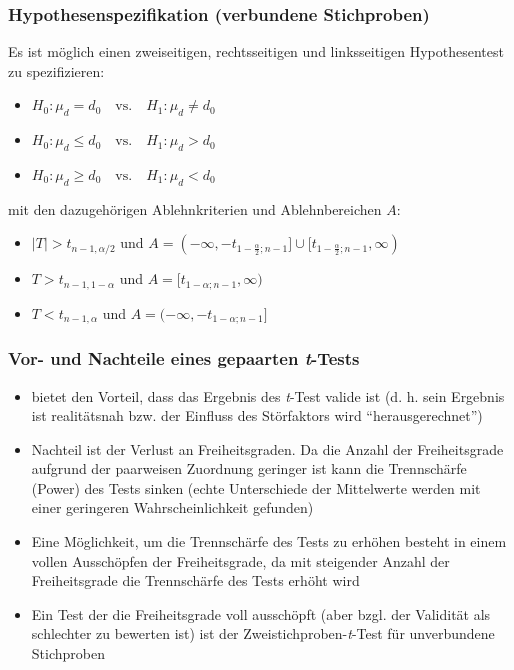 \documentclass{beamer}
\begin{document}
\begin{frame}
\frametitle{Hypothesenspezifikation (verbundene Stichproben)}

Es ist möglich einen zweiseitigen, rechtsseitigen und linksseitigen Hypothesentest zu spezifizieren:
\begin{itemize}
\item $H_0\colon \mu_{d} = d_{0} \quad \text{vs.} \quad H_1\colon \mu_{d} \ne d_{0}$
\item $H_0\colon \mu_{d} \leq d_{0} \quad \text{vs.} \quad H_1\colon \mu_{d} > d_{0}$
\item $H_0\colon \mu_{d} \geq d_{0} \quad \text{vs.} \quad H_1\colon \mu_{d} < d_{0}$
\end{itemize}

mit den dazugehörigen Ablehnkriterien und Ablehnbereichen $A$:
\begin{itemize}
\item $|T|>t_{n-1, \alpha/2}$ und $A =(-\infty,-t_{1-\frac{\alpha}2;n-1}]\cup [t_{1-\frac{\alpha}2;n-1},\infty)$
\item $T>t_{n-1, 1-\alpha}$ und $A = [t_{1-\alpha;n-1},\infty)$
\item $T < t_{n-1, \alpha}$ und $A = (-\infty,-t_{1-\alpha;n-1}]$
\end{itemize}


\end{frame}

\begin{frame}
\frametitle{Vor- und Nachteile eines gepaarten \textit{t}-Tests}
\begin{itemize}
\item bietet den Vorteil, dass das Ergebnis des \textit{t}-Test valide ist (d. h. sein Ergebnis ist realitätsnah bzw. der Einfluss des Störfaktors wird "`herausgerechnet"')
\item Nachteil ist der Verlust an Freiheitsgraden. Da die Anzahl der Freiheitsgrade aufgrund der paarweisen Zuordnung geringer ist kann die Trennschärfe (Power) des Tests sinken (echte Unterschiede der Mittelwerte werden mit einer geringeren Wahrscheinlichkeit gefunden)
\item Eine Möglichkeit, um die Trennschärfe des Tests zu erhöhen besteht in einem vollen Ausschöpfen der Freiheitsgrade, da mit steigender Anzahl der Freiheitsgrade die Trennschärfe des Tests erhöht wird
\item Ein Test der die Freiheitsgrade voll ausschöpft (aber bzgl. der Validität als schlechter zu bewerten ist) ist der Zweistichproben-\textit{t}-Test für unverbundene Stichproben
\end{itemize}


\end{frame}
\end{document}
